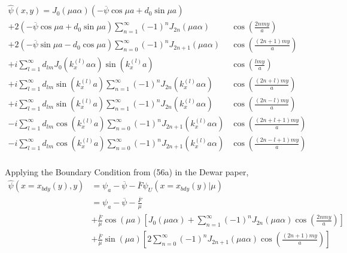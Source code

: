 \documentclass{article}
\begin{document}
\begin{equation}
    \begin{split}
        \hat{\psi}(x,y) = J_0\left( \mu a \alpha \right)\left(-\overline{\psi}\cos{\mu a} + d_0\sin{\mu a} \right)& \\
        + 2\left(-\overline{\psi}\cos{\mu a} + d_0\sin{\mu a} \right) \sum_{n=1}^{\infty} (-1)^n J_{2n} \left( \mu a \alpha \right) &\cos\left( \frac{2nmy}{a} \right) \\
        + 2\left(-\overline{\psi}\sin{\mu a} - d_0\cos{\mu a} \right) \sum_{n=0}^{\infty}(-1)^{n}J_{2n+1}\left(\mu a \alpha \right)&\cos\left( \frac{(2n+1)my}{a}\right) \\
        +i \sum_{l=1}^{\infty} d_{lm}J_0\left( k_x^{(l)} a \alpha \right)\sin\left( k_x^{(l)} a \right) &\cos\left( \frac{lmy}{a} \right) \\
        +i \sum_{l=1}^{\infty} d_{lm}\sin\left( k_x^{(l)} a \right) \sum_{n=1}^{\infty} (-1)^n J_{2n} \left( k_x^{(l)} a \alpha \right) &\cos\left( \frac{(2n+l)my}{a} \right) \\
        +i \sum_{l=1}^{\infty} d_{lm}\sin\left( k_x^{(l)} a \right) \sum_{n=1}^{\infty} (-1)^n J_{2n} \left( k_x^{(l)} a \alpha \right) &\cos\left( \frac{(2n-l)my}{a} \right) \\
        -i \sum_{l=1}^{\infty} d_{lm}\cos\left( k_x^{(l)} a \right) \sum_{n=0}^{\infty}(-1)^{n}J_{2n+1}\left( k_x^{(l)  } a \alpha \right)&\cos\left( \frac{(2n+l+1)my}{a}\right) \\
        -i \sum_{l=1}^{\infty} d_{lm}\cos\left( k_x^{(l)} a \right) \sum_{n=0}^{\infty}(-1)^{n}J_{2n+1}\left( k_x^{(l)  } a \alpha \right)&\cos\left( \frac{(2n-l+1)my}{a}\right) \\
    \end{split}
\end{equation} 

Applying the Boundary Condition from (56a) in the Dewar paper,
\begin{equation}
    \begin{split}
        \hat{\psi}(x=x_{bdy}(y),y)&=\psi_a -\overline{\psi} -\overline{F}\psi_U(x=x_{bdy}(y)|\mu) \\
                                  &=\psi_a -\overline{\psi} -\frac{\overline{F}}{\mu} \\
                                  &+\frac{\overline{F}}{\mu}\cos\left( \mu a \right) \left[ J_0(\mu a \alpha) + \sum_{n=1}^{\infty} (-1)^n J_{2n}(\mu a \alpha) \cos\left( \frac{2nmy}{a} \right)\right] \\
                                  &+\frac{\overline{F}}{\mu}\sin\left( \mu a \right) \left[2 \sum_{n=0}^{\infty} (-1)^n J_{2n+1}(\mu a \alpha) \cos\left(\frac{(2n+1)my}{a}\right)\right]
    \end{split}
\end{equation} 
\end{document}
